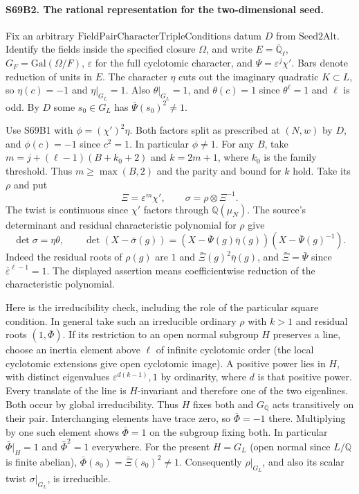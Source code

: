 \paragraph{S69B2. The rational representation for the two-dimensional seed.}
Fix an arbitrary $\mathrm{FieldPairCharacterTripleConditions}$
datum $D$ from $\mathrm{Seed2Alt}$. Identify the fields inside the
specified closure $\Omega$, and write $E=\overline{\mathbb Q}_\ell$,
$G_F=\mathrm{Gal}(\Omega/F)$, $\varepsilon$ for the full cyclotomic
character, and $\Psi=\varepsilon^j\chi'$. Bars denote reduction of
units in $E$. The character $\eta$ cuts out the imaginary
quadratic $K\subset L$, so $\eta(c)=-1$ and $\eta|_{G_L}=1$.
Also $\theta|_{G_L}=1$, and $\theta(c)=1$ since $\theta^\ell=1$
and $\ell$ is odd. By $D$ some $s_0\in G_L$ has
$\bar\Psi(s_0)^2\ne1$.

Use S69B1 with $\phi=(\chi')^2\eta$. Both factors split as
prescribed at $(N,w)$ by $D$, and $\phi(c)=-1$ since $c^2=1$.
In particular $\phi\ne1$. For any $B$, take
$m=j+(\ell-1)(B+k_0+2)$ and $k=2m+1$, where $k_0$ is the
family threshold. Thus $m\ge\max(B,2)$ and the parity and
bound for $k$ hold. Take its $\rho$ and put
\[
  \Xi=\varepsilon^m\chi',\qquad \sigma=\rho\otimes\Xi^{-1}.
\]
The twist is continuous since $\chi'$ factors through
$\mathbb Q(\mu_N)$. The source's determinant and residual
characteristic polynomial for $\rho$ give
\[
 \det\sigma=\eta\theta,\qquad
 \det(X-\bar\sigma(g))=
      (X-\bar\Psi(g)\bar\eta(g))(X-\bar\Psi(g)^{-1}) .
\]
Indeed the residual roots of $\rho(g)$ are $1$ and
$\bar\Xi(g)^2\bar\eta(g)$, and $\bar\Xi=\bar\Psi$ since
$\bar\varepsilon^{\ell-1}=1$. The displayed assertion means
coefficientwise reduction of the characteristic polynomial.

Here is the irreducibility check, including the role of the
particular square condition. In general take such an irreducible
ordinary $\rho$ with $k>1$ and residual roots $(1,\bar\Phi)$.
If its restriction to an open normal subgroup $H$ preserves a
line, choose an inertia element above $\ell$ of infinite
cyclotomic order (the local cyclotomic extensions give open
cyclotomic image). A positive power lies in $H$, with distinct
eigenvalues $\varepsilon^{d(k-1)},1$ by ordinarity, where $d$
is that positive power. Every translate of the line is
$H$-invariant and therefore one of the two eigenlines. Both occur
by global irreducibility. Thus $H$ fixes both and $G_{\mathbb Q}$
acts transitively on their pair. Interchanging elements have
trace zero, so $\bar\Phi=-1$ there. Multiplying by one such
element shows $\bar\Phi=1$ on the subgroup fixing both.
In particular $\bar\Phi|_H=1$ and $\bar\Phi^2=1$ everywhere.
For the present $H=G_L$ (open normal since $L/\mathbb Q$ is
finite abelian), $\bar\Phi(s_0)=\bar\Xi(s_0)^2\ne1$.
Consequently $\rho|_{G_L}$, and also its scalar twist
$\sigma|_{G_L}$, is irreducible.


